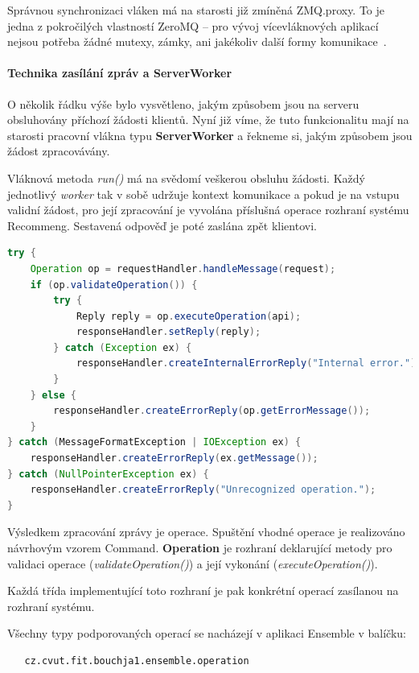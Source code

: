 \documentclass[thesis=M,czech]{FITthesis}[2014/05/07]
\begin{document}
Správnou synchronizaci vláken má na starosti již zmíněná ZMQ.proxy. To je jedna z pokročilých vlastností ZeroMQ – pro vývoj vícevláknových aplikací nejsou potřeba žádné mutexy, zámky, ani jakékoliv další formy komunikace~\cite{mtserver}.

\paragraph{Technika zasílání zpráv a ServerWorker}
\label{serverworker}
O několik řádku výše bylo vysvětleno, jakým způsobem jsou na serveru obsluhovány příchozí žádosti klientů. Nyní již víme, že tuto funkcionalitu mají na starosti pracovní vlákna typu \textbf{ServerWorker} a řekneme si, jakým způsobem jsou žádost zpracovávány.

Vláknová metoda \emph{run()} má na svědomí veškerou obsluhu žádosti. Každý jednotlivý \emph{worker} tak v sobě udržuje kontext komunikace a pokud je na vstupu validní žádost, pro její zpracování je vyvolána příslušná operace rozhraní systému Recommeng. Sestavená odpověď je poté zaslána zpět klientovi.

\begin{lstlisting}[language=java]
try {
    Operation op = requestHandler.handleMessage(request);
    if (op.validateOperation()) {
        try {
            Reply reply = op.executeOperation(api);
            responseHandler.setReply(reply);
        } catch (Exception ex) {
            responseHandler.createInternalErrorReply("Internal error.");
        }
    } else {
        responseHandler.createErrorReply(op.getErrorMessage());
    }
} catch (MessageFormatException | IOException ex) {
    responseHandler.createErrorReply(ex.getMessage());
} catch (NullPointerException ex) {
    responseHandler.createErrorReply("Unrecognized operation.");
}
\end{lstlisting}

Výsledkem zpracování zprávy je operace. Spuštění vhodné operace je realizováno návrhovým vzorem Command. \textbf{Operation} je rozhraní deklarující metody pro validaci operace (\emph{validateOperation()}) a její vykonání (\emph{executeOperation()}).

Každá třída implementující toto rozhraní je pak konkrétní operací zasílanou na rozhraní systému. 

Všechny typy podporovaných operací se nacházejí v aplikaci Ensemble v balíčku:

\begin{verbatim}
   cz.cvut.fit.bouchja1.ensemble.operation
\end{verbatim}
\end{document}
